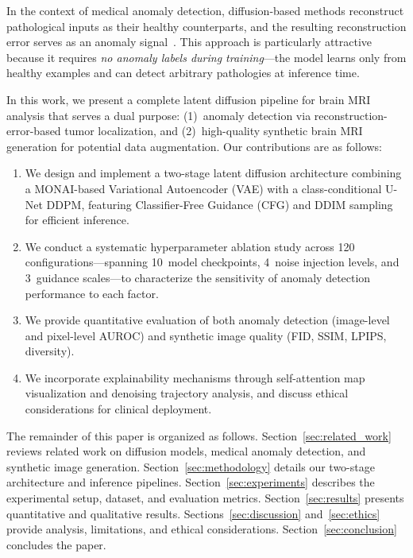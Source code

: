 In the context of medical anomaly detection, diffusion-based methods reconstruct pathological inputs as their healthy counterparts, and the resulting reconstruction error serves as an anomaly signal~\cite{wyatt2022anoddpm, wolleb2022diffusion, sanchez2022healthy}. This approach is particularly attractive because it requires \textit{no anomaly labels during training}---the model learns only from healthy examples and can detect arbitrary pathologies at inference time.

In this work, we present a complete latent diffusion pipeline for brain MRI analysis that serves a dual purpose: (1)~anomaly detection via reconstruction-error-based tumor localization, and (2)~high-quality synthetic brain MRI generation for potential data augmentation. Our contributions are as follows:

\begin{enumerate}[leftmargin=*]
  \item We design and implement a two-stage latent diffusion architecture combining a MONAI-based Variational Autoencoder (VAE) with a class-conditional U-Net DDPM, featuring Classifier-Free Guidance (CFG) and DDIM sampling for efficient inference.
  \item We conduct a systematic hyperparameter ablation study across 120 configurations---spanning 10~model checkpoints, 4~noise injection levels, and 3~guidance scales---to characterize the sensitivity of anomaly detection performance to each factor.
  \item We provide quantitative evaluation of both anomaly detection (image-level and pixel-level AUROC) and synthetic image quality (FID, SSIM, LPIPS, diversity).
  \item We incorporate explainability mechanisms through self-attention map visualization and denoising trajectory analysis, and discuss ethical considerations for clinical deployment.
\end{enumerate}

The remainder of this paper is organized as follows. Section~\ref{sec:related_work} reviews related work on diffusion models, medical anomaly detection, and synthetic image generation. Section~\ref{sec:methodology} details our two-stage architecture and inference pipelines. Section~\ref{sec:experiments} describes the experimental setup, dataset, and evaluation metrics. Section~\ref{sec:results} presents quantitative and qualitative results. Sections~\ref{sec:discussion} and~\ref{sec:ethics} provide analysis, limitations, and ethical considerations. Section~\ref{sec:conclusion} concludes the paper.

